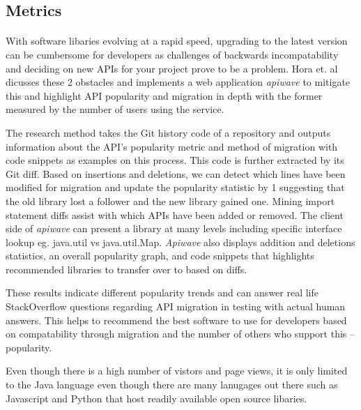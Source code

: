 \documentclass[12pt]{article}
\begin{document}


\subsection{Metrics}
\paragraph{}
With software libaries evolving at a rapid speed, upgrading to the latest version can be cumbersome for developers
as challenges of backwards incompatability and deciding on new APIs for your project prove to be a problem.
Hora et. al \cite{apiwave} dicusses these 2 obstacles and implements a web application \textit{apiwave} \cite{apiwavewebsite} to mitigate this and
highlight API popularity and migration in depth with the former measured by the number of users using the service.

The research method takes the Git history code of a repository and outputs information about the API's popularity metric and method of migration with code snippets as examples on this process.
This code is further extracted by its Git diff. Based on insertions and deletions, we can detect which lines have been modified for migration 
and update the popularity statistic by 1 suggesting that the old library lost a follower and the new library gained one.
Mining import statement diffs assist with which APIs have been added or removed.
The client side of \textit{apiwave} \cite{apiwavewebsite} can present a library at many levels including specific interface lookup eg. java.util vs java.util.Map.
\textit{Apiwave} also displays addition and deletions statistics, an overall popularity graph, 
and code snippets that highlights recommended libraries to transfer over to based on diffs.

These results indicate different popularity trends and can answer real life StackOverflow \cite{stackoverflow} 
questions regarding API migration in testing with actual human answers. 
This helps to recommend the best software to use for developers based on compatability through migration
and the number of others who support this -- popularity.

Even though there is a high number of vistors and page views, it is only limited to the Java language even though there are many lanugages out there
such as Javascript and Python that host readily available open source libaries. 
\end{document}
